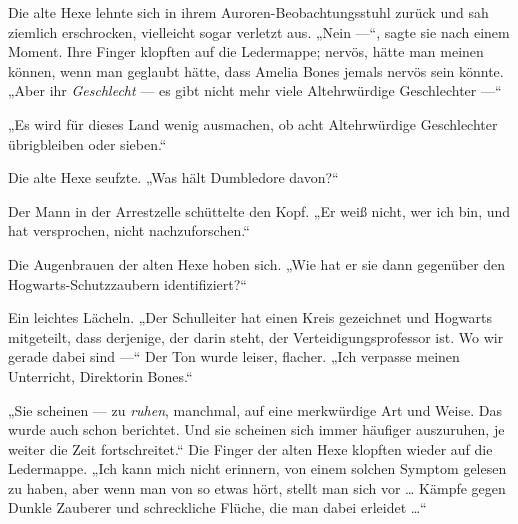 Die alte Hexe lehnte sich in ihrem Auroren-Beobachtungsstuhl zurück und sah ziemlich erschrocken, vielleicht sogar verletzt aus.
„Nein —“, sagte sie nach einem Moment. Ihre Finger klopften auf die Ledermappe; nervös, hätte man meinen können, wenn man geglaubt hätte, dass Amelia Bones jemals nervös sein könnte.
„Aber ihr \emph{Geschlecht} — es gibt nicht mehr viele Altehrwürdige Geschlechter —“

„Es wird für dieses Land wenig ausmachen, ob acht Altehrwürdige Geschlechter übrigbleiben oder sieben.“

Die alte Hexe seufzte.
„Was hält Dumbledore davon?“

Der Mann in der Arrestzelle schüttelte den Kopf.
„Er weiß nicht, wer ich bin, und hat versprochen, nicht nachzuforschen.“

Die Augenbrauen der alten Hexe hoben sich.
„Wie hat er sie dann gegenüber den Hogwarts-Schutzzaubern identifiziert?“

Ein leichtes Lächeln.
„Der Schulleiter hat einen Kreis gezeichnet und Hogwarts mitgeteilt, dass derjenige, der darin steht, der Verteidigungsprofessor ist. Wo wir gerade dabei sind —“ Der Ton wurde leiser, flacher.
„Ich verpasse meinen Unterricht, Direktorin Bones.“

„Sie scheinen — zu \emph{ruhen}, manchmal, auf eine merkwürdige Art und Weise. Das wurde auch schon berichtet. Und sie scheinen sich immer häufiger auszuruhen, je weiter die Zeit fortschreitet.“ Die Finger der alten Hexe klopften wieder auf die Ledermappe.
„Ich kann mich nicht erinnern, von einem solchen Symptom gelesen zu haben, aber wenn man von so etwas hört, stellt man sich vor … Kämpfe gegen Dunkle Zauberer und schreckliche Flüche, die man dabei erleidet …“

